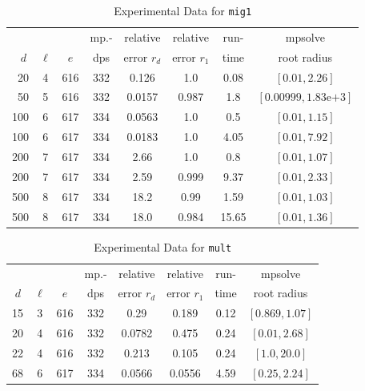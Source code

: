 \documentclass[runningheads]{llncs}
\begin{document}
\begin{table}
\caption{Experimental Data for \texttt{mig1}} %
\label{tab:mig1}
\vskip -0.15in
\begin{center}
\begin{small}
\begin{sc}
\begin{tabular}{rccccccc}
\toprule
&  &  & mp.-& relative  & relative & run- & mpsolve \\
$d~$& $\ell$& $e$ & dps&error $r_d$       & error $r_1$ &time& root radius\\
\midrule
 20 & 4 & 616 & 332 & 0.126 & 1.0 & 0.08 & $[0.01, 2.26]$\\
  50 & 5 & 616 & 332 & 0.0157 & 0.987 & 1.8 & $[0.00999, 1.83\text{e+}3]$\\
 100 & 6 & 617 & 334 & 0.0563 & 1.0 & 0.5 & $[0.01, 1.15]$\\
 100 & 6 & 617 & 334 & 0.0183 & 1.0 & 4.05 & $[0.01, 7.92]$\\
 200 & 7 & 617 & 334 & 2.66 & 1.0 & 0.8 & $[0.01, 1.07]$\\
 200 & 7 & 617 & 334 & 2.59 & 0.999 & 9.37 & $[0.01, 2.33]$\\
 500 & 8 & 617 & 334 & 18.2 & 0.99 & 1.59 & $[0.01, 1.03]$\\
 500 & 8 & 617 & 334 & 18.0 & 0.984 & 15.65 & $[0.01, 1.36]$\\ %
\bottomrule
\end{tabular}
\end{sc}
\end{small}
\end{center}
\vskip 0.05in
\end{table}


\begin{table}
\caption{Experimental Data for \texttt{mult}} %
\label{tab:mult}
\vskip -0.15in
\begin{center}
\begin{small}
\begin{sc}
\begin{tabular}{rccccccc}
\toprule
&  &  & mp.-& relative  & relative & run- & mpsolve \\
$d~$& $\ell$& $e$ & dps&error $r_d$       & error $r_1$ &time& root radius\\
\midrule
 15 & 3 & 616 & 332 & 0.29 & 0.189 & 0.12 & $[0.869, 1.07]$\\
 20 & 4 & 616 & 332 & 0.0782 & 0.475 & 0.24 & $[0.01, 2.68]$\\
 22 & 4 & 616 & 332 & 0.213 & 0.105 & 0.24 & $[1.0, 20.0]$\\
  68 & 6 & 617 & 334 & 0.0566 & 0.0556 & 4.59 & $[0.25, 2.24]$\\
\bottomrule
\end{tabular}
\end{sc}
\end{small}
\end{center}
\vskip 0.05in
\end{table}
\end{document}
